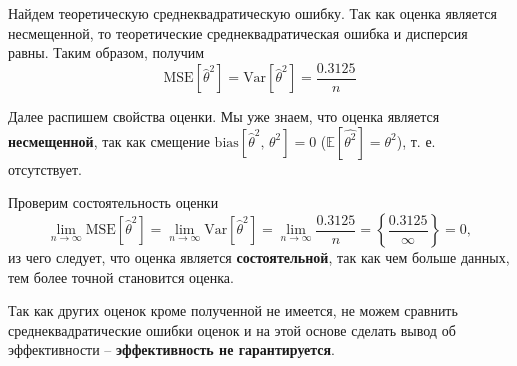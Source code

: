 \documentclass[a4paper, 12pt]{article}
\begin{document}
    
    Найдем теоретическую среднеквадратическую ошибку. Так как оценка является несмещенной, то теоретические среднеквадратическая ошибка и дисперсия равны. Таким образом, получим
    $$\text{MSE}{\left[\hat{\theta}^2\right]}=\text{Var}{\left[\hat{\theta}^2\right]}=\dfrac{0.3125}{n}$$


    Далее распишем свойства оценки. Мы уже знаем, что оценка является \textbf{несмещенной}, так как смещение $\text{bias}{\left[\hat{\theta}^2,\,\theta^2\right]}=0$ ($\mathbb{E}\left[\hat{\theta^2}\right]=\theta^2$), т. е. отсутствует.


    Проверим состоятельность оценки
    $$\lim\limits_{n\rightarrow\infty}\text{MSE}{\left[\hat{\theta}^2\right]}=\lim\limits_{n\rightarrow\infty}\text{Var}{\left[\hat{\theta}^2\right]}=\lim\limits_{n\rightarrow\infty}\dfrac{0.3125}{n}=\left\{\dfrac{0.3125}{\infty}\right\}=0,$$
    из чего следует, что оценка является \textbf{состоятельной}, так как чем больше данных, тем более точной становится оценка.


    Так как других оценок кроме полученной не имеется, не можем сравнить среднеквадратические ошибки оценок и на этой основе сделать вывод об эффективности -- \textbf{эффективность не гарантируется}.


    
\end{document}
